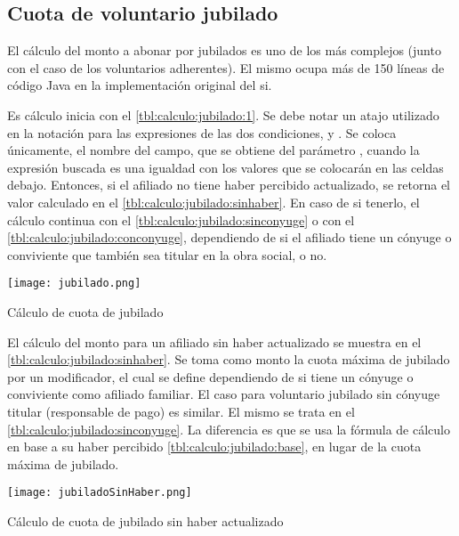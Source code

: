 \subsection{Cuota de voluntario jubilado}

El cálculo del monto a abonar por jubilados es uno de los más complejos (junto con el caso de los voluntarios adherentes).
El mismo ocupa más de 150 líneas de código Java en la implementación original del \acrshort{si}.

Es cálculo inicia con el \cref{tbl:calculo:jubilado:1}.
Se debe notar un atajo utilizado en la notación para las expresiones de las dos condiciones,  y .
Se coloca únicamente, el nombre del campo, que se obtiene del parámetro , cuando la expresión buscada es una igualdad con los valores que se colocarán en las celdas debajo.
Entonces, si el afiliado no tiene haber percibido actualizado, se retorna el valor calculado en el \cref{tbl:calculo:jubilado:sinhaber}. 
En caso de si tenerlo, 
el cálculo continua con el \cref{tbl:calculo:jubilado:sinconyuge} o con el \cref{tbl:calculo:jubilado:conconyuge}, dependiendo de si el afiliado tiene un cónyuge o conviviente que también sea titular en la obra social, o no.

\begin{table*}
    \centering
    \texttt{[image: jubilado.png]}
    \caption{Cálculo de cuota de jubilado}
    \label{tbl:calculo:jubilado:1}
\end{table*}

El cálculo del monto para un afiliado sin haber actualizado se muestra en el \cref{tbl:calculo:jubilado:sinhaber}.
Se toma como monto la cuota máxima de jubilado por un modificador, el cual se define dependiendo de si tiene un cónyuge o conviviente como afiliado familiar.
El caso para voluntario jubilado sin cónyuge titular (responsable de pago) es similar.
El mismo se trata en el \cref{tbl:calculo:jubilado:sinconyuge}.
La diferencia es que se usa la fórmula de cálculo en base a su haber percibido \cref{tbl:calculo:jubilado:base}, en lugar de la cuota máxima de jubilado.

\begin{table*}
    \centering
    \texttt{[image: jubiladoSinHaber.png]}
    \caption{Cálculo de cuota de jubilado sin haber actualizado}
    \label{tbl:calculo:jubilado:sinhaber}
\end{table*}


